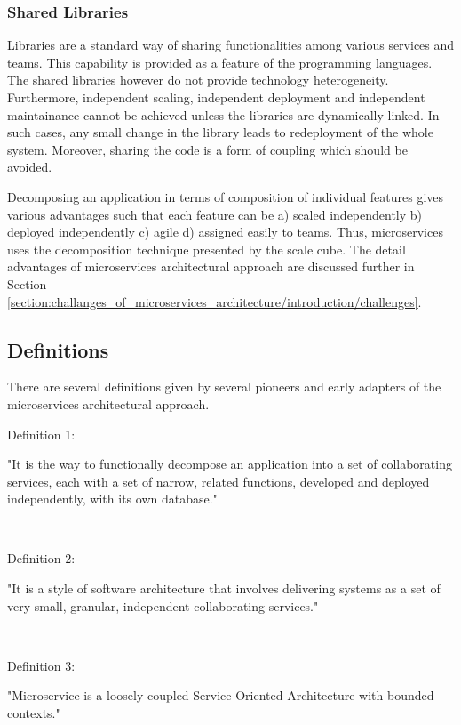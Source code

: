 \subsubsection{Shared Libraries}\label{section:context/microservices_architecture_style/decompostion_of_an_application/shared_libraries}
Libraries are a standard way of sharing functionalities among various services and teams. This capability is provided as a feature of the programming languages. The shared libraries however do not provide technology heterogeneity. Furthermore,  independent scaling, independent deployment and independent maintainance cannot be achieved unless the libraries are dynamically linked. In such cases, any small change in the library leads to redeployment of the whole system. Moreover, sharing the code is a form of coupling which should be avoided.

Decomposing an application in terms of composition of individual features gives various advantages such that each feature can be a) scaled independently b) deployed independently c) agile d) assigned easily to teams. Thus, microservices uses the decomposition technique presented by the scale cube. The detail advantages of microservices architectural approach are discussed further in Section \ref{section:challanges_of_microservices_architecture/introduction/challenges}.
\subsection{Definitions}\label{section:context/microservices_architecture_style/definitions}
There are several definitions given by several pioneers and early adapters of the microservices architectural approach.
\\
\begin{shaded}Definition 1: \cite{Richardson:2014ac} \end{shaded}
"It is the way to functionally decompose an application into a set of collaborating services, each with a set of narrow, related functions, developed and deployed independently, with its own database."

\\
\begin{shaded}Definition 2: \cite{Wootton:2014aa}\end{shaded}
"It is a style of software architecture that involves delivering systems as a set of very small, granular, independent collaborating services."


\\
\begin{shaded}Definition 3: \cite{Cockcroft:2015aa}\end{shaded}
"Microservice is a loosely coupled Service-Oriented Architecture with bounded contexts."


